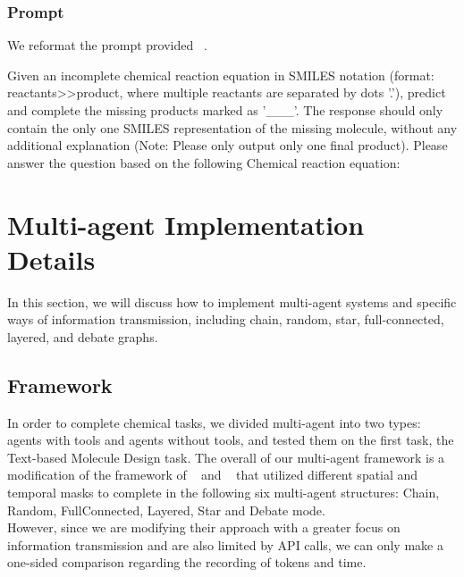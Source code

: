 \subsubsection{Prompt}
We reformat the prompt provided ~\cite{guo2023largelanguagemodelschemistry}.
\begin{tcolorbox}[colback=gray!10, colframe=black, title=Prompt: Reaction Prediction]
Given an incomplete chemical reaction equation in SMILES notation (format: reactants>>product, where multiple reactants are separated by dots '.'), predict and complete the missing products marked as '\_\_\_'. The response should only contain the only one SMILES representation of the missing molecule, without any additional explanation (Note: Please only output only one final product). Please answer the question based on the following Chemical reaction equation:
\end{tcolorbox}

\section{Multi-agent Implementation Details}

In this section, we will discuss how to implement multi-agent systems and specific ways of information transmission, including chain, random, star, full-connected, layered, and debate graphs.

\subsection{Framework}
\label{Framework}
In order to complete chemical tasks, we divided multi-agent into two types: agents with tools and agents without tools, and tested them on the first task, the Text-based Molecule Design task. The overall of our multi-agent framework is a modification of the framework of ~\cite{zhang2024cutcrapeconomicalcommunication} and ~\cite{qian2024scalinglargelanguagemodelbasedmultiagentcollaboration} that utilized different spatial and temporal masks to complete in the following six multi-agent structures: Chain, Random, FullConnected, Layered, Star and Debate mode. \\
However, since we are modifying their approach with a greater focus on information transmission and are also limited by API calls, we can only make a one-sided comparison regarding the recording of tokens and time.
